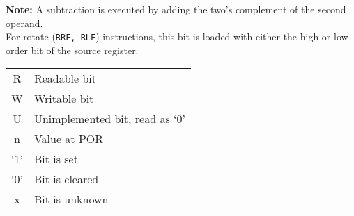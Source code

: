 \documentclass[a4paper,11pt]{article}
\begin{document}
	\noindent \textbf{Note:} A subtraction is executed by adding the two’s complement of the second operand. \\
	For rotate (\texttt{RRF, RLF}) instructions, this bit is loaded with either the high or low order bit of the source register.
	
	\vspace{0.5cm}
	
	\noindent
	\begin{tabular}{|c|l|}
		\hline
		R & Readable bit \\
		W & Writable bit \\
		U & Unimplemented bit, read as ‘0’ \\
		n & Value at POR \\
		‘1’ & Bit is set \\
		‘0’ & Bit is cleared \\
		x & Bit is unknown \\
		\hline
	\end{tabular}
	
	
\end{document}
